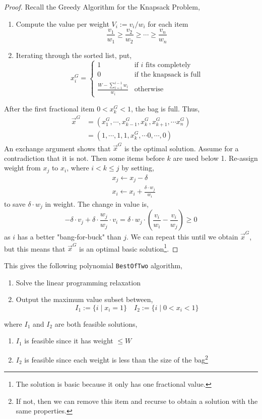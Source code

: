 \begin{proof}
	Recall the Greedy Algorithm for the Knapsack Problem,
	\begin{enumerate}
		\item Compute the value per weight $V_i := v_i / w_i$ for each item
		\[\frac{v_1}{w_1} \geq \frac{v_2}{w_2} \geq \cdots \geq \frac{v_n}{w_n}\]
		\item Iterating through the sorted list, put,
		\[
		x_i^G = \begin{cases}
			1 & \text{if $i$ fits completely} \\
			0 & \text{if the knapsack is full} \\
			\frac{W - \sum_{l=1}^{i-1} w_l}{w_i} & \text{otherwise}
		\end{cases}
		\]
	\end{enumerate}
	\noindent After the first fractional item $0 < x_k^G < 1$, the bag is full. Thus,
	\begin{align*}
		\Vec{x}^G &= \left(x_1^G, \cdots, x_{k-1}^G, x_k^G, x_{k+1}^G, \cdots x_n^G\right) \\
				  &= \left(1, \cdots, 1, 1, x_k^G, \cdots 0, \cdots, 0\right)
	\end{align*}
	\noindent An exchange argument shows that $\Vec{x}^G$ is the optimal solution. Assume for a contradiction that it is not. Then some items before $k$ are used below 1. Re-assign weight from $x_j$ to $x_i$, where $i < k \leq j$ by setting,
	\begin{align*}
		&x_j \leftarrow x_j - \delta \\
		&x_i \leftarrow x_i + \frac{\delta \cdot w_j}{w_i}
	\end{align*}
	to save $\delta \cdot w_j$ in weight. The change in value is,
	\[-\delta \cdot v_{j}+\delta \cdot \frac{w_{j}}{w_{j}} \cdot v_{i}=\delta \cdot w_{j} \cdot\left(\frac{v_{i}}{w_{i}}-\frac{v_{i}}{w_{j}}\right) \geq 0\]
	\noindent as $i$ has a better "bang-for-buck" than $j$. We can repeat this until we obtain $\Vec{x}^G$, but this means that $\Vec{x}^G$ is an optimal basic solution\footnote{The solution is basic because it only has one fractional value.}.
\end{proof}

\begin{rmk}
	This gives the following polynomial \texttt{BestOfTwo} algorithm,
	\begin{enumerate}
		\item Solve the linear programming relaxation
		\item Output the maximum value subset between,
		\[I_1 := \{i \mid x_i = 1\} \quad I_2 := \{i \mid 0 < x_i < 1\}\]
	\end{enumerate}
	\noindent where $I_1$ and $I_2$ are both feasible solutions,
	\begin{enumerate}
		\item $I_1$ is feasible since it has weight $\leq W$
		\item $I_2$ is feasible since each weight is less than the size of the bag\footnote{If not, then we can remove this item and recurse to obtain a solution with the same properties.}
	\end{enumerate}
\end{rmk}

